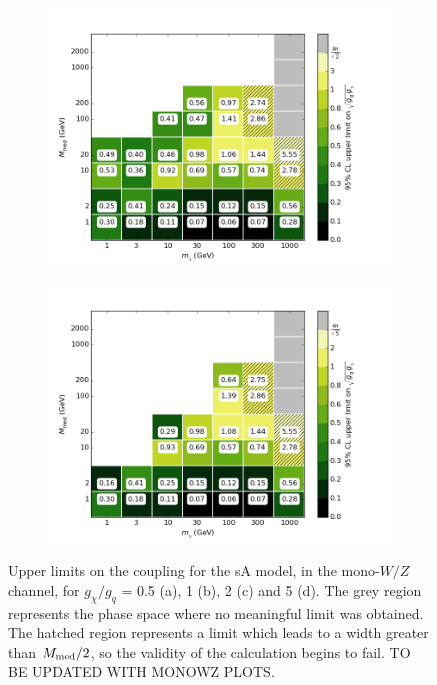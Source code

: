 \begin{figure}[h]
\begin{subfigure}[t]{0.45\textwidth}
      \includegraphics[width=1.\textwidth]{figures/grid_allpoints_SAD_rat2.png}
      \caption{}
    \end{subfigure}
    \begin{subfigure}[t]{0.45\textwidth}
      \centering
      \includegraphics[width=1.\textwidth]{figures/grid_allpoints_SAD_rat5.png}
      \caption{}
    \end{subfigure}
    \caption{Upper limits on the coupling for the sA model, in the mono-$W/Z$ channel, for $g_{\chi} / g_q$ = 0.5 (a), 1 (b), 2 (c) and 5 (d). The grey region represents the phase space where no meaningful limit was obtained. The hatched region represents a limit which leads to a width greater than $M_{\mathrm{med}} / 2$, so the validity of the calculation begins to fail. TO BE UPDATED WITH MONOWZ PLOTS.}
    \label{fig:MonoWZ_SAD_couplinglimit}
\end{figure}

